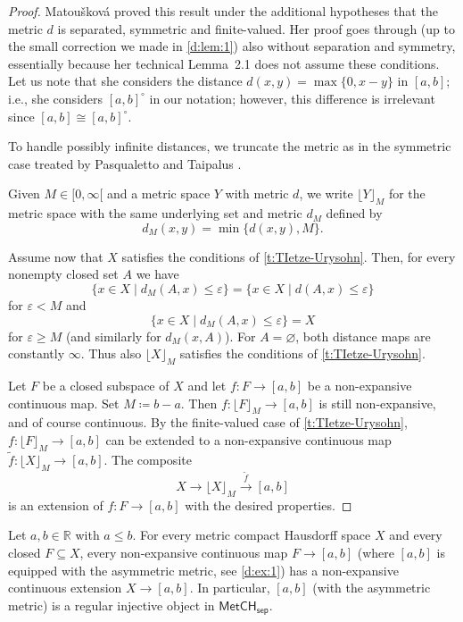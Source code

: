 \documentclass[11pt]{amsart}
\theoremstyle{definition}
\newcommand{\cat}[1]{\mathsf{#1}}
\newcommand{\MetCHsep}{\cat{MetCH_{sep}}}
\newcommand{\R}{\mathbb{R}}
\begin{document}
\begin{proof}
  Matou\v{s}kov\'a proved this result under the additional hypotheses that the metric \(d\) is separated, symmetric and finite-valued. Her proof goes through (up to the small correction we made in \cref{d:lem:1}) also without separation and symmetry, essentially because her technical Lemma~2.1 does not assume these conditions.
  Let us note that she considers  the distance \(d(x,y)=\max\{0,x-y\}\) in \([a,b]\); i.e., she considers \([a,b]^{\circ}\) in our notation; however, this difference is irrelevant since \([a,b]\cong[a,b]^{\circ}\).

  To handle possibly infinite distances, we truncate the metric as in the symmetric case treated by Pasqualetto and Taipalus \cite[proof of Thm.~3.1]{PT26}.

  Given $M \in [0, \infty[$ and a metric space $Y$ with metric $d$, we write $\lfloor Y \rfloor_M$ for the metric space with the same underlying set and metric $d_M$ defined by
  \[
    d_M(x,y) = \min\{d(x,y), M\}.
  \]

  Assume now that \(X\) satisfies the conditions of \cref{t:TIetze-Urysohn}. Then, for every nonempty closed set $A$ we have
  \begin{displaymath}
    \{x \in X \mid d_M(A,x) \leq \varepsilon\}
    =\{x \in X \mid d(A,x) \leq \varepsilon\}
  \end{displaymath}
  for \(\varepsilon<M\) and
  \begin{displaymath}
    \{x \in X \mid d_M(A,x) \leq \varepsilon\}=X
  \end{displaymath}
  for \(\varepsilon\geq M\) (and similarly for $d_M(x,A)$).
  For $A=\varnothing$, both distance maps are constantly $\infty$.
 Thus also $\lfloor X \rfloor_M$ satisfies the conditions of \cref{t:TIetze-Urysohn}.

  Let \(F\) be a closed subspace of \(X\) and let $f \colon F \to [a,b]$ be a non-expansive continuous map. Set $M \coloneqq b - a$.
  Then $f \colon \lfloor F \rfloor_M \to [a,b]$ is still non-expansive, and of course continuous. By the finite-valued case of \cref{t:TIetze-Urysohn}, $f \colon \lfloor F \rfloor_M \to [a,b]$ can be extended to a non-expansive continuous map $\tilde{f} \colon \lfloor X \rfloor_M \to [a,b]$.
  The composite
  \[
    X \longrightarrow \lfloor X\rfloor_M \xrightarrow{\;\,\tilde{f}\;\,} [a,b]
  \]
  is an extension of $f \colon F \to [a,b]$ with the desired properties.
\end{proof}

\begin{corollary}
  \label{t:reg-inj}
  Let $a,b \in \R$ with $a \leq b$.
  For every metric compact Hausdorff space \(X\) and every closed $F \subseteq X$, every non-expansive continuous map $F \to [a,b]$  (where $[a,b]$ is equipped with the asymmetric metric, see \cref{d:ex:1}) has a non-expansive continuous extension $X \to [a,b]$.
  In particular, $[a,b]$ (with the asymmetric metric) is a regular injective object in $\MetCHsep$.
\end{corollary}
\end{document}
